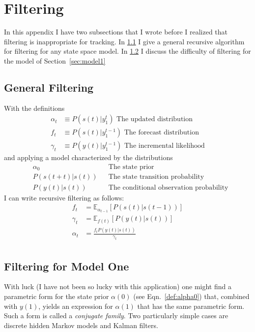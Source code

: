 \documentclass[11pt]{article}
\newcommand{\field}[1]{\mathbb{#1}}
\newcommand{\EV}[2]{\field{E}_{#1}\left[#2\right]}
\newcommand{\ti}[2]{{#1}{(#2)}}                         %
\newcommand{\ts}[4]{{#1}_{#3}^{#4}} %
\begin{document}
\section{Filtering}
\label{sec:filtering}

In this appendix I have two subsections that I wrote before I
realized that filtering is inappropriate for tracking.  In
\ref{sec:filtering1} I give a general recursive algorithm for filtering
for any state space model.  In \ref{sec:filter2} I discuss the
difficulty of filtering for the model of Section~\ref{sec:model1}

\subsection{General Filtering}
\label{sec:filtering1}

With the definitions
\begin{align}
  \label{def:alpha}
  \alpha_t &\equiv P(\ti{s}{t}|\ts{y}{\tau}{1}{t}) \text{ The updated distribution} \\
  f_t &\equiv P(\ti{s}{t}|\ts{y}{\tau}{1}{t-1}) \text{ The forecast
    distribution} \\
  \gamma_t &\equiv P(\ti{y}{t}|\ts{y}{\tau}{1}{t-1}) \text{ The
    incremental likelihood}
\end{align}
and applying a model characterized by the distributions
\begin{align}
  \label{def:alpha0}
  &\alpha_0  &&\text{The state prior} \\
  &P(\ti{s}{t+t}|\ti{s}{t}) &&\text{The state transition probability} \\
  &P(\ti{y}{t}|\ti{s}{t}) &&\text{The conditional observation probability}
\end{align}
I can write recursive filtering as follows:
\begin{align}
  f_t &= \EV{\alpha_{t-1}} {P(\ti{s}{t}|\ti{s}{t-1})} \\
  \gamma_t &= \EV{\ti{f}{t}} {P(\ti{y}{t}|\ti{s}{t})} \\
  \alpha_t &= \frac{f_t P(\ti{y}{t}|\ti{s}{t})}{\gamma_t} \\
\end{align}

\subsection{Filtering for Model One}
\label{sec:filter2}

With luck (I have not been so lucky with this application) one might
find a parametric form for the state prior $\alpha(0)$ (see
Eqn.~\eqref{def:alpha0}) that, combined with $\ti{y}{1}$, yields an
expression for $\alpha(1)$ that has the same parametric form.  Such a
form is called a \emph{conjugate family}.  Two particularly simple
cases are discrete hidden Markov models and Kalman filters.
\end{document}
